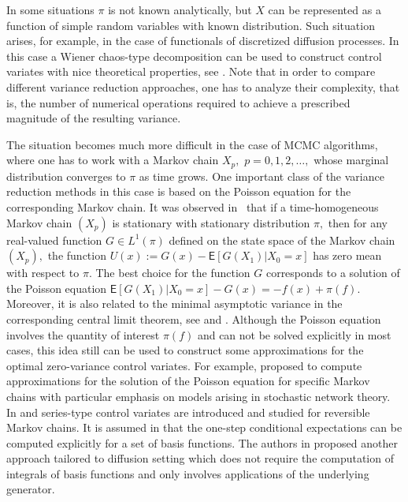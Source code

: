\documentclass[bj]{imsart}
\begin{document}
In some situations \(\pi\) is not known analytically, but \(X\) can be represented as a function of  simple random variables with known distribution.
Such  situation arises, for example, in the case of functionals of  discretized diffusion processes. In this case a Wiener chaos-type decomposition can be used to construct control variates with nice theoretical properties, see \cite{belomestny2018stratified}.
Note that in order to compare different  variance reduction approaches, one has to analyze their complexity, that is, the number of numerical operations required to achieve a prescribed magnitude of the resulting variance.


The situation becomes much more difficult in the case of MCMC algorithms, where one  has to work with a
Markov chain \(X_p,\) \(p=0,1,2,\ldots,\) whose marginal distribution  converges  to \(\pi\) as time grows. One important class of the variance reduction methods in this case  is based on the Poisson equation for the corresponding  Markov chain. It was observed in~\cite{henderson1997variance}  that if a time-homogeneous Markov chain \((X_p)\) is stationary with stationary distribution \(\pi,\) then for any real-valued function \(G \in L^1(\pi) \) defined on the state space of the Markov chain \((X_p),\)  the function \(U(x) := G(x)-\mathsf{E}[G(X_{1})|X_0 = x]\) has zero mean with respect to \(\pi\).  The best choice for the function \(G\) corresponds to a solution of the Poisson equation  \(\mathsf{E}[G(X_{1})|X_0 = x]-G(x)=-f(x)+\pi(f)\).  Moreover, it is also related to the minimal asymptotic variance in the corresponding central limit theorem, see \cite{duncan2016variance} and \cite{mira2013zero}.   Although the Poisson equation involves the quantity of interest \(\pi(f)\)  and can not be  solved explicitly in most cases, this idea still can be used to construct some  approximations for the optimal zero-variance control variates. For example,  \cite{henderson1997variance} proposed to compute approximations for the solution of the Poisson equation for specific Markov chains with particular emphasis on models arising in stochastic network theory. In \cite{dellaportas2012control} and \cite{brosse2018diffusion}  series-type control variates are introduced and studied for reversible Markov chains. It is assumed in \cite{dellaportas2012control}  that the one-step conditional expectations  can be computed explicitly  for a set of basis functions. The authors in \cite{brosse2018diffusion} proposed another approach tailored to diffusion setting which does not require the computation of integrals of basis functions and only involves  applications of the underlying generator.
\end{document}
